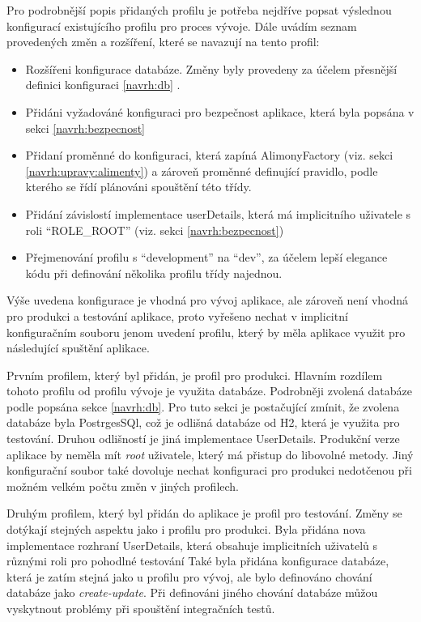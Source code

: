     Pro podrobnější popis přidaných profilu je potřeba nejdříve popsat výslednou konfigurací existujícího profilu pro proces vývoje. Dále uvádím seznam provedených změn a rozšíření, které se navazují na tento profil:
    \begin{itemize}
            \item Rozšířeni konfigurace databáze. Změny byly provedeny za účelem přesnější definici konfiguraci \ref{navrh:db} . 
            \item Přidáni vyžadováné konfiguraci pro bezpečnost aplikace, která byla popsána v sekci \ref{navrh:bezpecnost} 
            \item Přidaní proměnné do konfiguraci, která zapíná AlimonyFactory (viz. sekci \ref{navrh:upravy:alimenty}) a zároveň proměnné definující pravidlo, podle kterého se řídí plánováni spouštění této třídy.
            \item Přidání závislostí implementace userDetails, která má implicitního uživatele s roli \enquote{ROLE\_ROOT} (viz. sekci \ref{navrh:bezpecnost})
            \item Přejmenování profilu s \enquote{development} na \enquote{dev}, za účelem lepší elegance kódu při definování několika profilu třídy najednou.
    \end{itemize}
    
    Výše uvedena konfigurace je vhodná pro vývoj aplikace, ale zároveň není vhodná pro produkci a testování aplikace, proto vyřešeno nechat v implicitní konfiguračním souboru jenom uvedení profilu, který by měla aplikace využit pro následující spuštění aplikace.
    
    Prvním profilem, který byl přidán, je profil pro produkci. Hlavním rozdílem tohoto profilu od profilu vývoje je využita databáze. Podrobněji zvolená databáze podle popsána sekce \ref{navrh:db}. Pro tuto sekci je postačující zmínit, že zvolena databáze byla PostrgesSQl, což je odlišná databáze od H2, která je využita pro testování. Druhou odlišností je jiná implementace UserDetails. Produkční verze aplikace by neměla mít \textit{root} uživatele, který má přistup do libovolné metody. Jiný konfigurační soubor také dovoluje nechat konfiguraci pro produkci nedotčenou při možném velkém počtu změn v jiných profilech.
    
    Druhým profilem, který byl přidán do aplikace je profil pro testování. Změny se dotýkají stejných aspektu jako i profilu pro produkci. Byla přidána nova implementace rozhraní UserDetails, která obsahuje implicitních uživatelů s různými roli pro pohodlné testování  Také byla přidána konfigurace databáze, která je zatím stejná jako u profilu pro vývoj, ale bylo definováno chování databáze jako \textit{create-update}. Při definováni jiného chování databáze můžou vyskytnout problémy při spouštění integračních testů.
    
